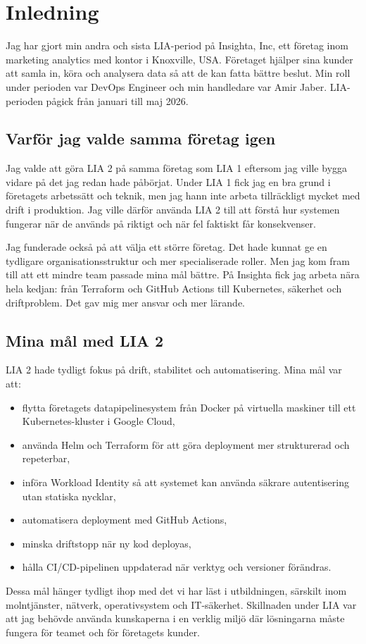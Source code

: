 \section{Inledning}
\label{sec:inledning}

Jag har gjort min andra och sista LIA-period på Insighta, Inc, ett företag inom marketing
analytics med kontor i Knoxville, USA. Företaget hjälper sina kunder att samla in, köra och
analysera data så att de kan fatta bättre beslut. Min roll under perioden var DevOps Engineer
och min handledare var Amir Jaber. LIA-perioden pågick från januari till
maj 2026.

\subsection*{Varför jag valde samma företag igen}

Jag valde att göra LIA 2 på samma företag som LIA 1 eftersom jag ville bygga vidare på det
jag redan hade påbörjat. Under LIA 1 fick jag en bra grund i företagets arbetssätt och teknik,
men jag hann inte arbeta tillräckligt mycket med drift i produktion. Jag ville därför använda
LIA 2 till att förstå hur systemen fungerar när de används på riktigt och när fel faktiskt får
konsekvenser.

Jag funderade också på att välja ett större företag. Det hade kunnat ge en tydligare
organisationsstruktur och mer specialiserade roller. Men jag kom fram till att ett mindre team
passade mina mål bättre. På Insighta fick jag arbeta nära hela kedjan: från Terraform och
GitHub Actions till Kubernetes, säkerhet och driftproblem. Det gav mig mer ansvar och mer
lärande.

\subsection*{Mina mål med LIA 2}

LIA 2 hade tydligt fokus på drift, stabilitet och automatisering. Mina mål var att:

\begin{itemize}
  \item flytta företagets datapipelinesystem från Docker på virtuella maskiner till ett
        Kubernetes-kluster i Google Cloud,
  \item använda Helm och Terraform för att göra deployment mer strukturerad och repeterbar,
  \item införa Workload Identity så att systemet kan använda säkrare autentisering utan
        statiska nycklar,
  \item automatisera deployment med GitHub Actions,
  \item minska driftstopp när ny kod deployas,
  \item hålla CI/CD-pipelinen uppdaterad när verktyg och versioner förändras.
\end{itemize}

Dessa mål hänger tydligt ihop med det vi har läst i utbildningen, särskilt inom molntjänster,
nätverk, operativsystem och IT-säkerhet. Skillnaden under LIA var att jag behövde använda
kunskaperna i en verklig miljö där lösningarna måste fungera för teamet och för företagets
kunder.